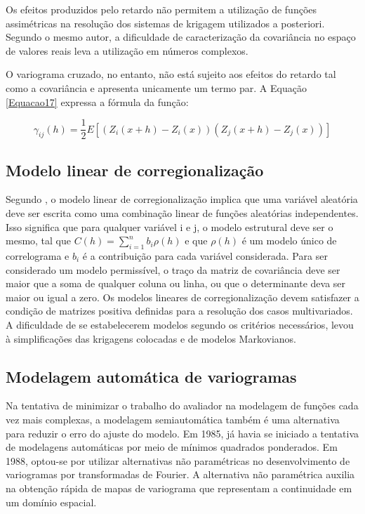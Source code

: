 Os efeitos produzidos pelo retardo não permitem a utilização de funções assimétricas na resolução dos sistemas de krigagem utilizados a posteriori. Segundo o mesmo autor, a dificuldade de caracterização da covariância no espaço de valores reais leva a utilização em números complexos. 

O variograma cruzado, no entanto, não está sujeito aos efeitos do retardo tal como a covariância e apresenta unicamente um termo par. A Equação \ref{Equacao17} expressa a fórmula da função: 

\begin{equation}\label{Equacao17}
\gamma_{ij}(h) = \frac{1}{2}E\left[ \left( Z_i(x+h) - Z_i(x)\right) \left( Z_j(x+h) - Z_j(x)\right) \right] 
\end{equation}

\subsection{Modelo linear de corregionalização}

Segundo , o modelo linear de corregionalização implica que uma variável aleatória deve ser escrita como uma combinação linear de funções aleatórias independentes. Isso significa que para qualquer variável i e j, o modelo estrutural deve ser o mesmo, tal que $C(h)=\sum_{i=1}^{n} b_i\rho(h) $ e que $\rho(h)$ é um modelo único de correlograma e $b_i$ é a contribuição para cada variável considerada. Para ser considerado um modelo permissível, o traço da matriz de covariância deve ser maior que a soma de qualquer coluna ou linha, ou que o determinante deva ser maior ou igual a zero. Os modelos lineares de corregionalização devem satisfazer a condição de matrizes positiva definidas para a resolução dos casos multivariados. A dificuldade de se estabelecerem modelos segundo os critérios necessários, levou à simplificações das krigagens colocadas e de modelos Markovianos. 

\subsection{Modelagem automática de variogramas}

Na tentativa de minimizar o trabalho do avaliador na modelagem de funções cada vez mais complexas, a modelagem semiautomática também é uma alternativa para reduzir o erro do ajuste do modelo. Em 1985, já havia se iniciado a tentativa de modelagens automáticas por meio de mínimos quadrados ponderados. Em 1988, optou-se por utilizar alternativas não paramétricas no desenvolvimento de variogramas por transformadas de Fourier. A alternativa não paramétrica auxilia na obtenção rápida de mapas de variograma que representam a continuidade em um domínio espacial. 

